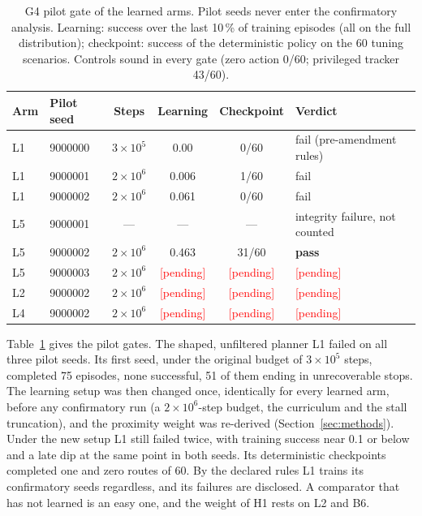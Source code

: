 \documentclass[11pt]{article}
\newcommand{\pending}[1][held-out: pending]{\textcolor{red}{[#1]}}
\theoremstyle{definition}
\begin{document}
\begin{table}[!htbp]
\centering
\caption{G4 pilot gate of the learned arms. Pilot seeds never enter the confirmatory analysis. Learning:
success over the last 10\,\% of training episodes (all on the full distribution); checkpoint: success of
the deterministic policy on the 60 tuning scenarios. Controls sound in every gate (zero action 0/60;
privileged tracker 43/60).}
\label{tab:g4}
\small
\begin{tabular}{llcccl}
\toprule
Arm & Pilot seed & Steps & Learning & Checkpoint & Verdict\\
\midrule
L1 & 9000000 & $3\times10^5$ & 0.00 & 0/60 & fail (pre-amendment rules)\\
L1 & 9000001 & $2\times10^6$ & 0.006 & 1/60 & fail\\
L1 & 9000002 & $2\times10^6$ & 0.061 & 0/60 & fail\\
L5 & 9000001 & --- & --- & --- & integrity failure, not counted\\
L5 & 9000002 & $2\times10^6$ & 0.463 & 31/60 & \textbf{pass}\\
L5 & 9000003 & $2\times10^6$ & \pending[pending] & \pending[pending] & \pending[pending]\\
L2 & 9000002 & $2\times10^6$ & \pending[pending] & \pending[pending] & \pending[pending]\\
L4 & 9000002 & $2\times10^6$ & \pending[pending] & \pending[pending] & \pending[pending]\\
\bottomrule
\end{tabular}
\end{table}

Table~\ref{tab:g4} gives the pilot gates. The shaped, unfiltered planner L1 failed on all three pilot
seeds. Its first seed, under the original budget of $3\times10^5$ steps, completed 75 episodes, none
successful, 51 of them ending in unrecoverable stops. The learning setup was then changed once, identically
for every learned arm, before any confirmatory run (a $2\times10^6$-step budget, the curriculum and the
stall truncation), and the proximity weight was re-derived (Section~\ref{sec:methods}). Under the new
setup L1 still failed twice, with training success near 0.1 or below and a late dip at the same point in
both seeds. Its deterministic checkpoints completed one and zero routes of 60. By the declared rules L1 trains its
confirmatory seeds regardless, and its failures are disclosed. A comparator that has not learned is an easy one, and
the weight of H1 rests on L2 and B6.
\end{document}
